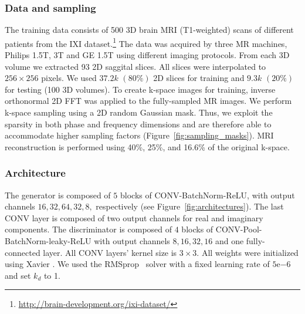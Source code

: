 \documentclass[10pt,journal,compsoc]{IEEEtran}
\begin{document}
\subsubsection*{\bf Data and sampling}
The training data consists of 500 3D brain MRI (T1-weighted) scans of different patients from the IXI dataset.\footnote{\url{http://brain-development.org/ixi-dataset/}} The data was acquired by three MR machines, Philips 1.5T, 3T and GE 1.5T using different imaging protocols.
From each 3D volume we extracted 93 2D saggital slices. All slices were interpolated to $256\times256$ pixels. We used $37.2k$ $(80\%)$ 2D slices for training and $9.3k$ $(20\%)$ for testing (100 3D volumes).
To create k-space images for training, inverse orthonormal
2D FFT was applied to the fully-sampled MR images. 
We perform k-space sampling using a 2D random Gaussian mask. Thus, we exploit the sparsity in both phase and frequency dimensions and are therefore able to accommodate higher sampling factors (Figure~\ref{fig:sampling_masks}). MRI reconstruction is performed using 40\%, 25\%, and 16.6\% of the original k-space.

\subsubsection*{\bf Architecture}
The generator is composed of $5$ blocks of CONV-BatchNorm-ReLU, with output channels $16,32,64,32,8,$ respectively (see Figure~\ref{fig:architectures}). The last CONV layer is composed of two output channels for real and imaginary components. The discriminator is composed of $4$ blocks of CONV-Pool-BatchNorm-leaky-ReLU with output channels $8,16,32,16$ and one fully-connected layer. All CONV layers' kernel size is $3\times3$. All weights were initialized using Xavier \cite{glorot2010understanding}. We used the RMSprop~\cite{tieleman2012lecture} solver with a fixed learning rate of $5\mathrm{e}{-6}$ and set $k_{d}$ to 1.
\end{document}
